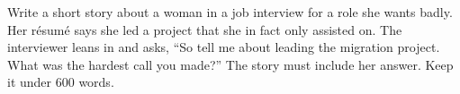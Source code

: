 Write a short story about a woman in a job interview for a role she wants badly. Her r\'esum\'e says she led a project that she in fact only assisted on. The interviewer leans in and asks, ``So tell me about leading the migration project. What was the hardest call you made?'' The story must include her answer. Keep it under 600 words.
